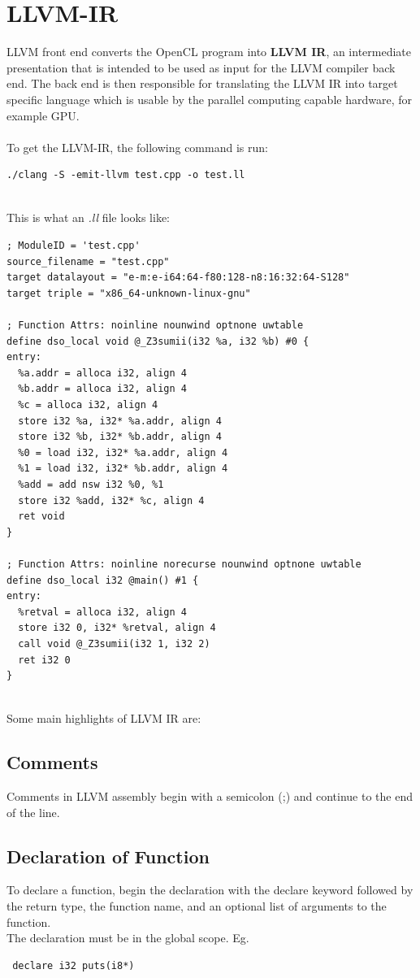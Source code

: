 \documentclass{article}
\begin{document}
\section{LLVM-IR}
LLVM front end converts the OpenCL program into \textbf{LLVM IR}, an intermediate presentation that is intended to be used as input for the LLVM compiler back end. The back end is then responsible for translating the LLVM IR into target specific language which is usable by the parallel computing capable hardware, for example GPU.\\
\\
To get the LLVM-IR, the following command is run:
\begin{verbatim}
./clang -S -emit-llvm test.cpp -o test.ll
\end{verbatim}
\\
This is what an \textit{.ll} file looks like:
\begin{verbatim}
; ModuleID = 'test.cpp'
source_filename = "test.cpp"
target datalayout = "e-m:e-i64:64-f80:128-n8:16:32:64-S128"
target triple = "x86_64-unknown-linux-gnu"

; Function Attrs: noinline nounwind optnone uwtable
define dso_local void @_Z3sumii(i32 %a, i32 %b) #0 {
entry:
  %a.addr = alloca i32, align 4
  %b.addr = alloca i32, align 4
  %c = alloca i32, align 4
  store i32 %a, i32* %a.addr, align 4
  store i32 %b, i32* %b.addr, align 4
  %0 = load i32, i32* %a.addr, align 4
  %1 = load i32, i32* %b.addr, align 4
  %add = add nsw i32 %0, %1
  store i32 %add, i32* %c, align 4
  ret void
}

; Function Attrs: noinline norecurse nounwind optnone uwtable
define dso_local i32 @main() #1 {
entry:
  %retval = alloca i32, align 4
  store i32 0, i32* %retval, align 4
  call void @_Z3sumii(i32 1, i32 2)
  ret i32 0
}

\end{verbatim}
\\
Some main highlights of LLVM IR are:
\subsection{Comments}
Comments in LLVM assembly begin with a semicolon (;) and continue to the end of the line.

\subsection{Declaration of Function}
To declare a function, begin the declaration with the declare keyword followed by the return type, the function name, and an optional list of arguments to the function.\\
The declaration must be in the global scope. Eg. \begin{verbatim}
 declare i32 puts(i8*)
\end{verbatim}
\end{document}
